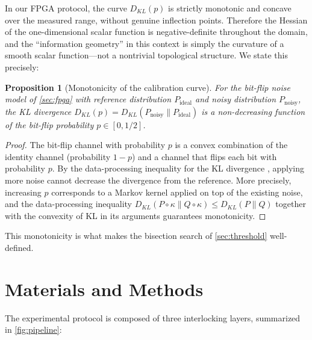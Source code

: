 \documentclass[12pt,a4paper,oneside]{book}
\theoremstyle{plain}
\newtheorem{proposition}[theorem]{Proposition}
\theoremstyle{definition}
\theoremstyle{remark}
\begin{document}
In our FPGA protocol, the curve $D_{KL}(p)$ is strictly monotonic and concave over the measured range, without genuine inflection points. Therefore the Hessian of the one-dimensional scalar function is negative-definite throughout the domain, and the ``information geometry'' in this context is simply the curvature of a smooth scalar function---not a nontrivial topological structure. We state this precisely:

\begin{proposition}[Monotonicity of the calibration curve]\label{prop:monotonicity}
For the bit-flip noise model of \cref{sec:fpga} with reference distribution $P_{\text{ideal}}$ and noisy distribution $P_{\text{noisy}}$, the KL divergence $D_{KL}(p) = D_{KL}(P_{\text{noisy}} \| P_{\text{ideal}})$ is a non-decreasing function of the bit-flip probability $p \in [0, 1/2]$.
\end{proposition}

\begin{proof}
The bit-flip channel with probability $p$ is a convex combination of the identity channel (probability $1 - p$) and a channel that flips each bit with probability $p$. By the data-processing inequality for the KL divergence \cite{cover2006elements}, applying more noise cannot decrease the divergence from the reference. More precisely, increasing $p$ corresponds to a Markov kernel applied on top of the existing noise, and the data-processing inequality $D_{KL}(P \circ \kappa \| Q \circ \kappa) \leq D_{KL}(P \| Q)$ together with the convexity of KL in its arguments guarantees monotonicity.
\end{proof}

This monotonicity is what makes the bisection search of \cref{sec:threshold} well-defined.

\chapter{Materials and Methods}
\label{chap:methods}

The experimental protocol is composed of three interlocking layers, summarized in \cref{fig:pipeline}:
\end{document}
